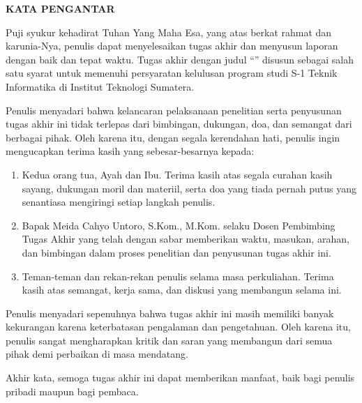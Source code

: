 \clearpage
{}%

\begin{justifying}
	\large \bfseries \centering \MakeUppercase{Kata Pengantar}\linebreak
	
	\normalsize \normalfont \justifying
	Puji syukur kehadirat Tuhan Yang Maha Esa, yang atas berkat rahmat dan karunia-Nya, penulis dapat menyelesaikan tugas akhir dan menyusun laporan dengan baik dan tepat waktu. Tugas akhir dengan judul ``{\thetitle}'' disusun sebagai salah satu syarat untuk memenuhi persyaratan kelulusan program studi S-1 Teknik Informatika di Institut Teknologi Sumatera. \par
	
	Penulis menyadari bahwa kelancaran pelaksanaan penelitian serta penyusunan tugas akhir ini tidak terlepas dari bimbingan, dukungan, doa, dan semangat dari berbagai pihak. Oleh karena itu, dengan segala kerendahan hati, penulis ingin mengucapkan terima kasih yang sebesar-besarnya kepada: \par
	\begin{enumerate}
		\item Kedua orang tua, Ayah dan Ibu. Terima kasih atas segala curahan kasih sayang, dukungan moril dan materiil, serta doa yang tiada pernah putus yang senantiasa mengiringi setiap langkah penulis.
		\item Bapak Meida Cahyo Untoro, S.Kom., M.Kom. selaku Dosen Pembimbing Tugas Akhir yang telah dengan sabar memberikan waktu, masukan, arahan, dan bimbingan dalam proses penelitian dan penyusunan tugas akhir ini.
		\item Teman-teman dan rekan-rekan penulis selama masa perkuliahan. Terima kasih atas semangat, kerja sama, dan diskusi yang membangun selama ini.
	\end{enumerate} \par
	Penulis menyadari sepenuhnya bahwa tugas akhir ini masih memiliki banyak kekurangan karena keterbatasan pengalaman dan pengetahuan. Oleh karena itu, penulis sangat mengharapkan kritik dan saran yang membangun dari semua pihak demi perbaikan di masa mendatang. \par
	
	Akhir kata, semoga tugas akhir ini dapat memberikan manfaat, baik bagi penulis pribadi maupun bagi pembaca.
	\vfill
	
\end{justifying}
\clearpage





